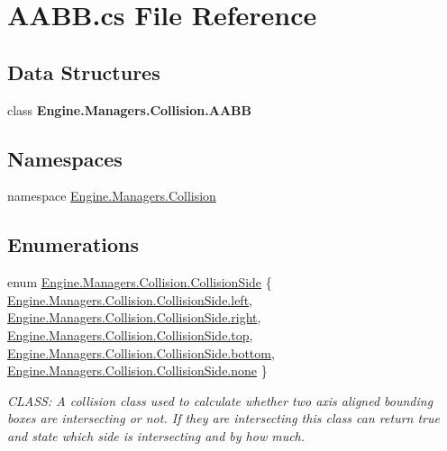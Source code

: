 \hypertarget{a00155}{}\section{A\+A\+B\+B.\+cs File Reference}
\label{a00155}
\subsection*{Data Structures}
\begin{DoxyCompactItemize}
\item 
class {\bfseries Engine.\+Managers.\+Collision.\+A\+A\+BB}
\end{DoxyCompactItemize}
\subsection*{Namespaces}
\begin{DoxyCompactItemize}
\item 
namespace \hyperlink{a00268}{Engine.\+Managers.\+Collision}
\end{DoxyCompactItemize}
\subsection*{Enumerations}
\begin{DoxyCompactItemize}
\item 
enum \hyperlink{a00268_addb954cde1b34937cfd0a187a154c8af}{Engine.\+Managers.\+Collision.\+Collision\+Side} \{ \newline
\hyperlink{a00268_addb954cde1b34937cfd0a187a154c8afa811882fecd5c7618d7099ebbd39ea254}{Engine.\+Managers.\+Collision.\+Collision\+Side.\+left}, 
\hyperlink{a00268_addb954cde1b34937cfd0a187a154c8afa7c4f29407893c334a6cb7a87bf045c0d}{Engine.\+Managers.\+Collision.\+Collision\+Side.\+right}, 
\hyperlink{a00268_addb954cde1b34937cfd0a187a154c8afab28354b543375bfa94dabaeda722927f}{Engine.\+Managers.\+Collision.\+Collision\+Side.\+top}, 
\hyperlink{a00268_addb954cde1b34937cfd0a187a154c8afa71f262d796bed1ab30e8a2d5a8ddee6f}{Engine.\+Managers.\+Collision.\+Collision\+Side.\+bottom}, 
\newline
\hyperlink{a00268_addb954cde1b34937cfd0a187a154c8afa334c4a4c42fdb79d7ebc3e73b517e6f8}{Engine.\+Managers.\+Collision.\+Collision\+Side.\+none}
 \}\begin{DoxyCompactList}\small\item\em C\+L\+A\+SS\+: A collision class used to calculate whether two axis aligned bounding boxes are intersecting or not. If they are intersecting this class can return true and state which side is intersecting and by how much. \end{DoxyCompactList}
\end{DoxyCompactItemize}
